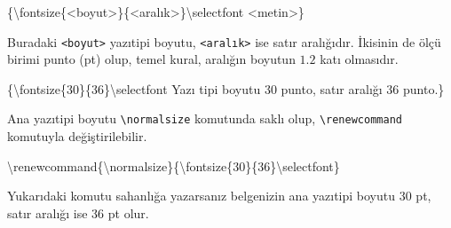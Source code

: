\documentclass[
  10pt,
]{scrbook}
\newenvironment{Shaded}{\begin{snugshade}}{\end{snugshade}}
\newcommand{\DecValTok}[1]{\textcolor[rgb]{0.00,0.00,0.81}{#1}}
\newcommand{\NormalTok}[1]{#1}
\newcommand{\SpecialCharTok}[1]{\textcolor[rgb]{0.00,0.00,0.00}{#1}}
\begin{document}
\begin{Shaded}
\begin{Highlighting}[]
\NormalTok{\{\textbackslash{}fontsize\{}\SpecialCharTok{\textless{}}\NormalTok{boyut}\SpecialCharTok{\textgreater{}}\NormalTok{\}\{}\SpecialCharTok{\textless{}}\NormalTok{aralık}\SpecialCharTok{\textgreater{}}\NormalTok{\}\textbackslash{}selectfont }\SpecialCharTok{\textless{}}\NormalTok{metin}\SpecialCharTok{\textgreater{}}\NormalTok{\}}
\end{Highlighting}
\end{Shaded}

Buradaki \texttt{\textless{}boyut\textgreater{}} yazıtipi boyutu, \texttt{\textless{}aralık\textgreater{}} ise satır aralığıdır.
İkisinin de ölçü birimi punto (pt) olup, temel kural, aralığın boyutun
\(1.2\) katı olmasıdır.

\begin{Shaded}
\begin{Highlighting}[]
\NormalTok{\{\textbackslash{}fontsize\{}\DecValTok{30}\NormalTok{\}\{}\DecValTok{36}\NormalTok{\}\textbackslash{}selectfont}
\NormalTok{Yazı tipi boyutu }\DecValTok{30}\NormalTok{ punto,}
\NormalTok{satır aralığı }\DecValTok{36}\NormalTok{ punto.\}}
\end{Highlighting}
\end{Shaded}

Ana yazıtipi boyutu \texttt{\textbackslash{}normalsize} komutunda saklı olup, \texttt{\textbackslash{}renewcommand}
komutuyla değiştirilebilir.

\begin{Shaded}
\begin{Highlighting}[]
\NormalTok{\textbackslash{}renewcommand\{\textbackslash{}normalsize\}\{\textbackslash{}fontsize\{}\DecValTok{30}\NormalTok{\}\{}\DecValTok{36}\NormalTok{\}\textbackslash{}selectfont\}}
\end{Highlighting}
\end{Shaded}

Yukarıdaki komutu sahanlığa yazarsanız belgenizin ana yazıtipi boyutu
30 pt, satır aralığı ise 36 pt olur.

\backmatter

  

\printindex
\end{document}
